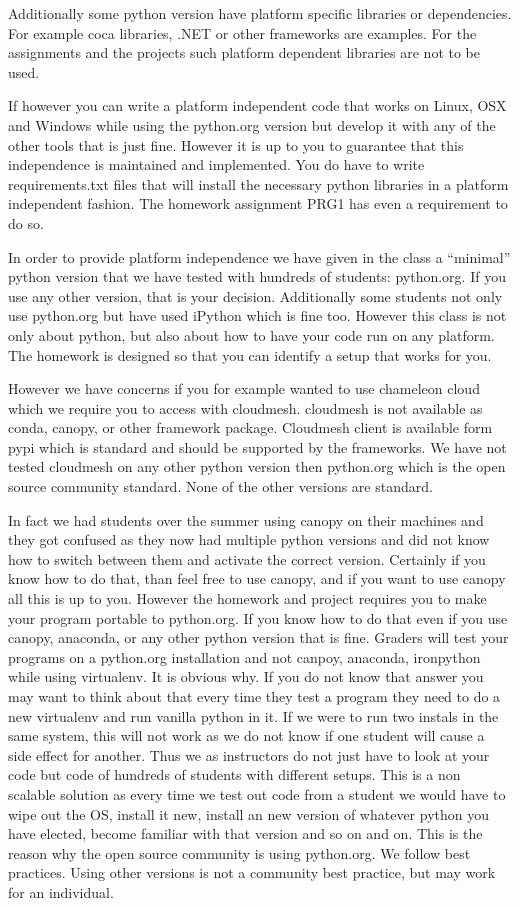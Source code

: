 Additionally some python version have platform specific libraries or
dependencies. For example coca libraries, .NET or other frameworks are
examples. For the assignments and the projects such platform dependent
libraries are not to be used.

If however you can write a platform independent code that works on
Linux, OSX and Windows while using the python.org version but develop it
with any of the other tools that is just fine. However it is up to you
to guarantee that this independence is maintained and implemented. You
do have to write requirements.txt files that will install the necessary
python libraries in a platform independent fashion. The homework
assignment PRG1 has even a requirement to do so.

In order to provide platform independence we have given in the class a
``minimal'' python version that we have tested with hundreds of
students: python.org. If you use any other version, that is your
decision. Additionally some students not only use python.org but have
used iPython which is fine too. However this class is not only about
python, but also about how to have your code run on any platform. The
homework is designed so that you can identify a setup that works for
you.

However we have concerns if you for example wanted to use chameleon
cloud which we require you to access with cloudmesh. cloudmesh is not
available as conda, canopy, or other framework package. Cloudmesh client
is available form pypi which is standard and should be supported by the
frameworks. We have not tested cloudmesh on any other python version
then python.org which is the open source community standard. None of the
other versions are standard.

In fact we had students over the summer using canopy on their machines
and they got confused as they now had multiple python versions and did
not know how to switch between them and activate the correct version.
Certainly if you know how to do that, than feel free to use canopy, and
if you want to use canopy all this is up to you. However the homework
and project requires you to make your program portable to python.org. If
you know how to do that even if you use canopy, anaconda, or any other
python version that is fine. Graders will test your programs on a
python.org installation and not canpoy, anaconda, ironpython while using
virtualenv. It is obvious why. If you do not know that answer you may
want to think about that every time they test a program they need to do
a new virtualenv and run vanilla python in it. If we were to run two
instals in the same system, this will not work as we do not know if one
student will cause a side effect for another. Thus we as instructors do
not just have to look at your code but code of hundreds of students with
different setups. This is a non scalable solution as every time we test
out code from a student we would have to wipe out the OS, install it
new, install an new version of whatever python you have elected, become
familiar with that version and so on and on. This is the reason why the
open source community is using python.org. We follow best practices.
Using other versions is not a community best practice, but may work for
an individual.

